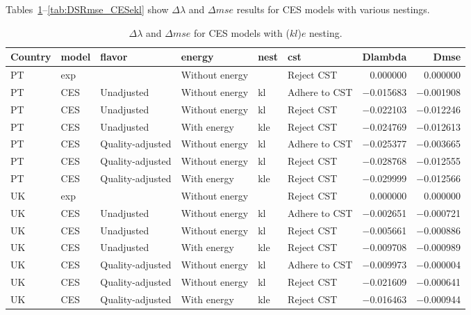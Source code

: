 \documentclass[preprint,authoryear,12pt]{elsarticle}\usepackage[]{graphicx}\usepackage[]{color}
\begin{document}
% 
Tables~\ref{tab:DSRmse_CESkle}--\ref{tab:DSRmse_CESekl} show $\Delta \lambda$ and $\Delta mse$ 
results for CES models with various nestings.
%
\begin{table}[ht]
\centering
\caption{$\Delta \lambda$ and $\Delta mse$ for CES models with ($kl$)$e$ nesting.} 
\label{tab:DSRmse_CESkle}
{\tiny
\begin{tabular}{llllllrr}
  \hline
Country & model & flavor & energy & nest & cst & Dlambda & Dmse \\ 
  \hline
PT & exp &  & Without energy &  & Reject CST & 0.000000 & 0.000000 \\ 
  PT & CES & Unadjusted & Without energy & kl & Adhere to CST & $-$0.015683 & $-$0.001908 \\ 
  PT & CES & Unadjusted & Without energy & kl & Reject CST & $-$0.022103 & $-$0.012246 \\ 
  PT & CES & Unadjusted & With energy & kle & Reject CST & $-$0.024769 & $-$0.012613 \\ 
  PT & CES & Quality-adjusted & Without energy & kl & Adhere to CST & $-$0.025377 & $-$0.003665 \\ 
  PT & CES & Quality-adjusted & Without energy & kl & Reject CST & $-$0.028768 & $-$0.012555 \\ 
  PT & CES & Quality-adjusted & With energy & kle & Reject CST & $-$0.029999 & $-$0.012566 \\ 
  UK & exp &  & Without energy &  & Reject CST & 0.000000 & 0.000000 \\ 
  UK & CES & Unadjusted & Without energy & kl & Adhere to CST & $-$0.002651 & $-$0.000721 \\ 
  UK & CES & Unadjusted & Without energy & kl & Reject CST & $-$0.005661 & $-$0.000886 \\ 
  UK & CES & Unadjusted & With energy & kle & Reject CST & $-$0.009708 & $-$0.000989 \\ 
  UK & CES & Quality-adjusted & Without energy & kl & Adhere to CST & $-$0.009973 & $-$0.000004 \\ 
  UK & CES & Quality-adjusted & Without energy & kl & Reject CST & $-$0.021609 & $-$0.000641 \\ 
  UK & CES & Quality-adjusted & With energy & kle & Reject CST & $-$0.016463 & $-$0.000944 \\ 
   \hline
\end{tabular}
}
\end{table}
\end{document}
